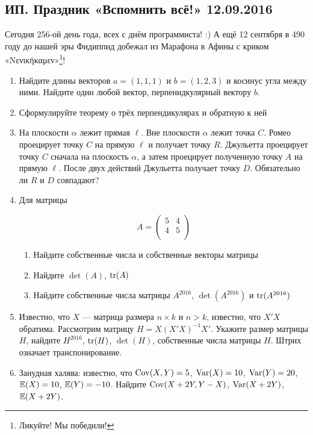 \documentclass[12pt, a4paper]{article}
\begin{document}
\subsection{ИП. Праздник «Вспомнить всё!» 12.09.2016}

Сегодня 256-ой день года, всех с днём программиста! :) А ещё 12 сентября в 490 году до нашей эры Фидиппид добежал из Марафона в Афины с криком «Νενικήκαμεν»\footnote{Ликуйте! Мы победили!}!


\begin{enumerate}
\item Найдите длины векторов $a=(1,1,1)$ и $b=(1,2,3)$ и косинус угла между ними. Найдите один любой вектор, перпенидкулярный вектору $b$.

\item Сформулируйте теорему о трёх перпендикулярах и обратную к ней

\item На плоскости $\alpha$ лежит прямая $\ell$. Вне плоскости $\alpha$ лежит точка $C$. Ромео проецирует точку $C$ на прямую $\ell$ и получает точку $R$. Джульетта проецирует точку $C$ сначала на плоскость $\alpha$, а затем проецирует полученную точку $A$ на прямую $\ell$. После двух действий Джульетта получает точку $D$. Обязательно ли $R$ и $D$ совпадают?

\item Для матрицы

\[
A=\begin{pmatrix}
5 & 4 \\
4 & 5 \\
\end{pmatrix}
\]

\begin{enumerate}
\item Найдите собственные числа и собственные векторы матрицы
\item Найдите $\det (A)$, $\operatorname{tr}(A)$
\item Найдите собственные числа матрицы $A^{2016}$, $\det (A^{2016})$ и $\operatorname{tr}(A^{2016})$
\end{enumerate}

\item Известно, что $X$ — матрица размера $n \times k$ и $n>k$, известно, что $X'X$ обратима. Рассмотрим матрицу $H=X(X'X)^{-1}X'$. Укажите размер матрицы $H$, найдите $H^{2016}$, $\operatorname{tr}(H)$, $\det(H)$, собственные числа матрицы $H$. Штрих означает транспонирование.

\item Занудная халява: известно, что $\operatorname{Cov}(X, Y)=5$, $\operatorname{Var}(X)=10$, $\operatorname{Var}(Y)=20$, $\mathbb{E}(X)=10$, $\mathbb{E}(Y)=-10$. Найдите $\operatorname{Cov}(X+2Y, Y-X)$, $\operatorname{Var}(X+2Y)$, $\mathbb{E}(X+2Y)$.


\end{enumerate}
\end{document}
